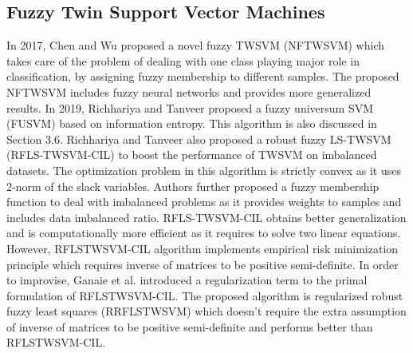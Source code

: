 \documentclass[pdflatex,sn-mathphys]{sn-jnl}%
\theoremstyle{thmstyleone}%
\theoremstyle{thmstyletwo}%
\theoremstyle{thmstylethree}%
\begin{document}
 


\subsection{Fuzzy Twin Support Vector Machines}
In 2017, Chen and Wu \cite{chen2018new} proposed a novel fuzzy TWSVM (NFTWSVM) which takes care of the problem of dealing with one class playing major role in classification, by assigning fuzzy membership to different samples. The proposed NFTWSVM includes fuzzy neural networks and provides more generalized results. In 2019, Richhariya and Tanveer \cite{richhariya2019fuzzy} proposed a fuzzy universum SVM (FUSVM) based on information entropy. This algorithm is also discussed in Section 3.6. Richhariya and Tanveer \cite{richhariya2018robust} also proposed a robust fuzzy LS-TWSVM (RFLS-TWSVM-CIL) to boost the performance of TWSVM on imbalanced datasets. The optimization problem in this algorithm is strictly convex as it uses 2-norm of the slack variables. Authors further proposed a fuzzy membership function to deal with imbalanced problems as it provides weights to samples and includes data imbalanced ratio. RFLS-TWSVM-CIL obtains better generalization and is computationally more efficient as it requires to solve two linear equations. However, RFLSTWSVM-CIL algorithm implements empirical risk minimization principle which requires inverse of matrices to be positive semi-definite. In order to improvise, Ganaie et al. \cite{ganaie2020regularized} introduced a regularization term to the primal formulation of RFLSTWSVM-CIL. The proposed algorithm is regularized robust fuzzy least squares (RRFLSTWSVM) which doesn't require the extra assumption of inverse of matrices to be positive semi-definite and performs better than RFLSTWSVM-CIL. 
\end{document}
